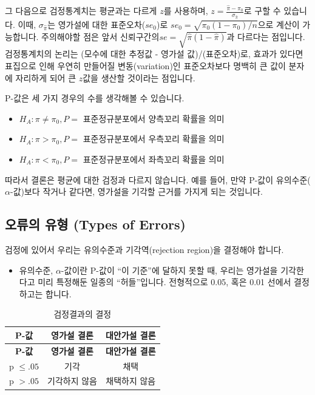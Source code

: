\documentclass[]{book}
\providecommand{\tightlist}{%
  \setlength{\itemsep}{0pt}\setlength{\parskip}{0pt}}
\begin{document}
그 다음으로 검정통계치는 평균과는 다르게 \(z\)를 사용하며, \(z = \frac{\hat{\pi} - \pi_0}{\sigma_{\hat{\pi}}}\)로 구할 수 있습니다. 이때, \(\sigma_{\hat{\pi}}\)는 영가설에 대한 표준오차(\(se_0\))로 \(se_0 = \sqrt{\pi_0(1-\pi_0)/n}\)으로 계산이 가능합니다. 주의해야할 점은 앞서 신뢰구간의\(se = \sqrt{\hat{\pi}(1-\hat{\pi})}\)과 다르다는 점입니다. 검정통계치의 논리는 (모수에 대한 추정값 - 영가설 값)/(표준오차)로, 효과가 있다면 표집으로 인해 우연히 만들어질 변동(variation)인 표준오차보다 명백히 큰 값이 분자에 자리하게 되어 큰 \(z\)값을 생산할 것이라는 점입니다.

P-값은 세 가지 경우의 수를 생각해볼 수 있습니다.

\begin{itemize}
\tightlist
\item
  \(H_A: \pi \neq \pi_0, P =\) 표준정규분포에서 양측꼬리 확률을 의미
\item
  \(H_A: \pi > \pi_0, P =\) 표준정규분포에서 우측꼬리 확률을 의미
\item
  \(H_A: \pi < \pi_0, P =\) 표준정규분포에서 좌측꼬리 확률을 의미
\end{itemize}

따라서 결론은 평균에 대한 검정과 다르지 않습니다. 예를 들어, 만약 P-값이 유의수준(\(\alpha\)-값)보다 작거나 같다면, 영가설을 기각할 근거를 가지게 되는 것입니다.

\hypertarget{uxc624uxb958uxc758-uxc720uxd615-types-of-errors}{%
\subsection{오류의 유형 (Types of Errors)}\label{uxc624uxb958uxc758-uxc720uxd615-types-of-errors}}

검정에 있어서 우리는 유의수준과 기각역(rejection region)을 결정해야 합니다.

\begin{itemize}
\tightlist
\item
  유의수준, \(\alpha\)-값이란 P-값이 ``이 기준''에 달하지 못할 때, 우리는 영가설을 기각한다고 미리 특정해둔 일종의 ``허들''입니다. 전형적으로 0.05, 혹은 0.01 선에서 결정하고는 합니다.
\end{itemize}

\begin{longtable}[]{@{}ccc@{}}
\caption{검정결과의 결정}\tabularnewline
\toprule
\textbf{P-값} & \textbf{영가설 결론} & \textbf{대안가설 결론}\tabularnewline
\midrule
\endfirsthead
\toprule
\textbf{P-값} & \textbf{영가설 결론} & \textbf{대안가설 결론}\tabularnewline
\midrule
\endhead
p \(\leq .05\) & 기각 & 채택\tabularnewline
p \(> .05\) & 기각하지 않음 & 채택하지 않음\tabularnewline
\bottomrule
\end{longtable}
\end{document}
